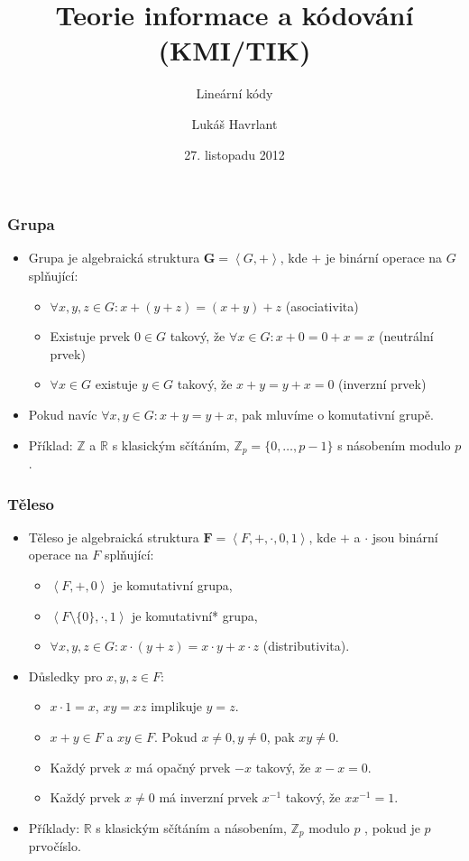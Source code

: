 \documentclass{beamer}
\title{Teorie informace a kódování (KMI/TIK)}
\subtitle{Lineární kódy}
\author{Lukáš Havrlant}
\date{27. listopadu 2012}
\institute{Univerzita Palackého}
\newcommand{\G}{\textbf{G}}
\newcommand{\F}{\textbf{F}}
\newenvironment{itemizex}%
  {\large \begin{itemize}%
    \setlength{\itemsep}{8pt}%
    \setlength{\parskip}{8pt}}%
  {\end{itemize}}
\begin{document}
\begin{frame}[t,plain]
\titlepage
\end{frame}



\begin{frame}[t,fragile]\frametitle{Grupa} 
    \begin{itemizex}
        \item Grupa je algebraická struktura $\G=\left<G,+\right>$, kde $+$ je binární operace na $G$ splňující: 
            \begin{itemize}
                \item $\forall x,y,z\in G: x+(y+z)=(x+y)+z$ (asociativita)
                \item Existuje prvek $0\in G$ takový, že $\forall x\in G: x+0=0+x=x$ (neutrální prvek)
                \item $\forall x\in G$ existuje $y\in G$ takový, že $x+y=y+x=0$ (inverzní prvek)
            \end{itemize}
        \item Pokud navíc $\forall x,y\in G: x+y=y+x$, pak mluvíme o komutativní grupě.
        \item Příklad: $\mathbb{Z}$ a $\mathbb{R}$ s klasickým sčítáním, $\mathbb{Z}_p=\{0,\dots,p-1\}$ s násobením modulo $p$.
    \end{itemizex}
\end{frame}


\begin{frame}[t,fragile]\frametitle{Těleso} 
    \begin{itemizex}
        \item Těleso je algebraická struktura $\F=\left<F,+,\cdot,0,1\right>$, kde $+$ a $\cdot$ jsou binární operace na $F$ splňující:
        \begin{itemize}
            \item $\left<F,+,0\right>$ je komutativní grupa,
            \item $\left<F\setminus\{0\},\cdot,1\right>$ je komutativní* grupa,
            \item $\forall x,y,z\in G: x\cdot(y+z)=x\cdot y+x\cdot z$ (distributivita).
        \end{itemize}
        \item Důsledky pro $x,y,z\in F$: 
        \begin{itemize}
            \item $x\cdot1=x$, $xy=xz$ implikuje $y=z$.
            \item $x+y\in F$ a $xy\in F$. Pokud $x\ne0, y\ne0$, pak $xy\ne0$.
            \item Každý prvek $x$ má opačný prvek $-x$ takový, že $x-x=0$.
            \item Každý prvek $x\ne0$ má inverzní prvek $x^{-1}$ takový, že $xx^{-1}=1$.
        \end{itemize}
        \item Příklady: $\mathbb{R}$ s klasickým sčítáním a násobením, $\mathbb{Z}_p$ modulo $p$ , pokud je $p$ prvočíslo.
    \end{itemizex}
\end{frame}
\end{document}
